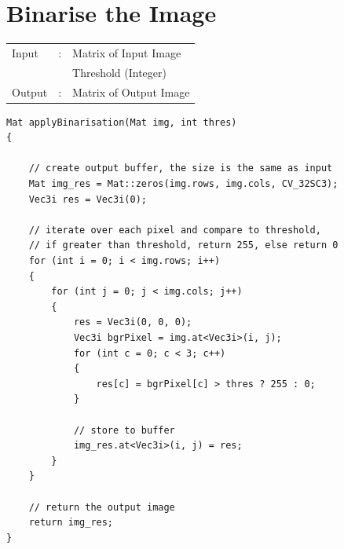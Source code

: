 \documentclass[12pt,a4paper]{report}
\begin{document}
\section{Binarise the Image}
\begin{tabular}{lll}
  Input  & : & Matrix of Input Image  \\
         &   & Threshold (Integer)    \\
  Output & : & Matrix of Output Image \\
\end{tabular}
\begin{lstlisting}
Mat applyBinarisation(Mat img, int thres)
{

    // create output buffer, the size is the same as input
    Mat img_res = Mat::zeros(img.rows, img.cols, CV_32SC3);
    Vec3i res = Vec3i(0);

    // iterate over each pixel and compare to threshold, 
    // if greater than threshold, return 255, else return 0
    for (int i = 0; i < img.rows; i++)
    {
        for (int j = 0; j < img.cols; j++)
        {
            res = Vec3i(0, 0, 0);
            Vec3i bgrPixel = img.at<Vec3i>(i, j);
            for (int c = 0; c < 3; c++)
            {
                res[c] = bgrPixel[c] > thres ? 255 : 0;
            }

            // store to buffer
            img_res.at<Vec3i>(i, j) = res;
        }
    }

    // return the output image
    return img_res;
}
\end{lstlisting}
\end{document}
